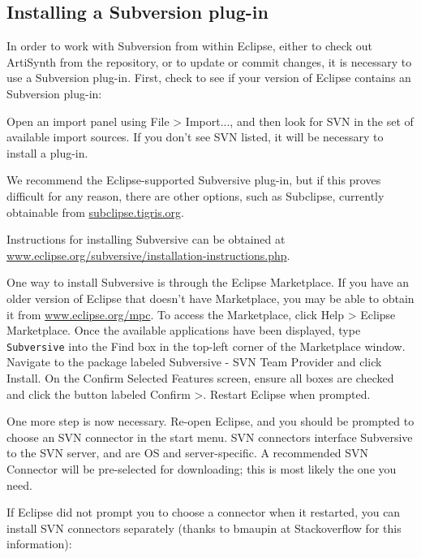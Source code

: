 \subsection{Installing a Subversion plug-in}
\label{SubversionPlugIn}

In order to work with Subversion from within Eclipse, either to check
out ArtiSynth from the repository, or to update or commit changes, it
is necessary to use a Subversion plug-in. First, check to see if your
version of Eclipse contains an Subversion plug-in:

Open an import panel using {\sf File > Import...}, and then look for
{\sf SVN} in the set of available import sources. If you don't see SVN
listed, it will be necessary to install a plug-in.

We recommend the Eclipse-supported Subversive plug-in, but if this
proves difficult for any reason, there are other options, such as
Subclipse, currently obtainable from
\href{http://subclipse.tigris.org/servlets/ProjectProcess?pageID=p4wYuA}%
{subclipse.tigris.org}.

Instructions for installing Subversive can be obtained at
\href{http://www.eclipse.org/subversive/installation-instructions.php}%
{www.eclipse.org/subversive/installation-instructions.php}.

One way to install Subversive is through the Eclipse Marketplace.  If
you have an older version of Eclipse that doesn't have Marketplace,
you may be able to obtain it from
\href{http://www.eclipse.org/mpc/}{www.eclipse.org/mpc}.  To access
the Marketplace, click {\sf Help > Eclipse Marketplace}. Once the
available applications have been displayed, type {\tt Subversive} into
the {\sf Find} box in the top-left corner of the Marketplace
window. Navigate to the package labeled {\sf Subversive - SVN Team
Provider} and click {\sf Install}. On the {\sf Confirm Selected
Features} screen, ensure all boxes are checked and click the button
labeled {\sf Confirm >}. Restart Eclipse when prompted.

One more step is now necessary. Re-open Eclipse, and you should be
prompted to choose an SVN connector in the start menu.  SVN connectors
interface Subversive to the SVN server, and are OS and
server-specific. A recommended SVN Connector will be pre-selected for
downloading; this is most likely the one you need.

If Eclipse did not prompt you to choose a connector when it restarted,
you can install SVN connectors separately (thanks to bmaupin at
Stackoverflow for this information):


